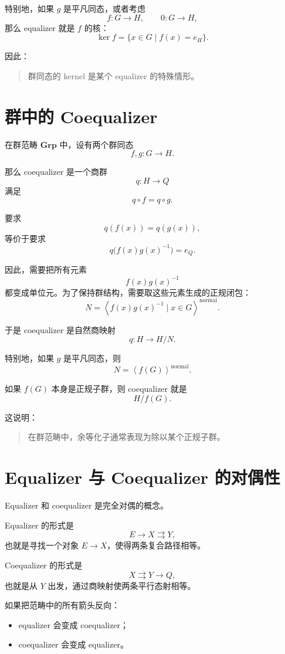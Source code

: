 \documentclass[UTF8, a4paper, 12pt]{ctexart}
\newcommand{\Grp}{\mathbf{Grp}}
\newcommand{\normalcl}[1]{\left\langle #1 \right\rangle^{\mathrm{normal}}}
\begin{document}
特别地，如果 \(g\) 是平凡同态，或者考虑
\[
f\colon G\to H,\qquad 0\colon G\to H,
\]
那么 equalizer 就是 \(f\) 的核：
\[
\ker f
=
\{x\in G\mid f(x)=e_H\}.
\]

因此：

\begin{quote}
群同态的 kernel 是某个 equalizer 的特殊情形。
\end{quote}

\section{群中的 Coequalizer}

在群范畴 \(\Grp\) 中，设有两个群同态
\[
f,g\colon G\to H.
\]

那么 coequalizer 是一个商群
\[
q\colon H\to Q
\]
满足
\[
q\circ f=q\circ g.
\]

要求
\[
q(f(x))=q(g(x)),
\]
等价于要求
\[
q\bigl(f(x)g(x)^{-1}\bigr)=e_Q.
\]

因此，需要把所有元素
\[
f(x)g(x)^{-1}
\]
都变成单位元。为了保持群结构，需要取这些元素生成的正规闭包：
\[
N=
\normalcl{
f(x)g(x)^{-1}\mid x\in G
}.
\]

于是 coequalizer 是自然商映射
\[
q\colon H\to H/N.
\]

特别地，如果 \(g\) 是平凡同态，则
\[
N=\normalcl{f(G)}.
\]

如果 \(f(G)\) 本身是正规子群，则 coequalizer 就是
\[
H/f(G).
\]

这说明：

\begin{quote}
在群范畴中，余等化子通常表现为除以某个正规子群。
\end{quote}

\section{Equalizer 与 Coequalizer 的对偶性}

Equalizer 和 coequalizer 是完全对偶的概念。

Equalizer 的形式是
\[
E\longrightarrow X\rightrightarrows Y,
\]
也就是寻找一个对象 \(E\to X\)，使得两条复合路径相等。

Coequalizer 的形式是
\[
X\rightrightarrows Y\longrightarrow Q,
\]
也就是从 \(Y\) 出发，通过商映射使两条平行态射相等。

如果把范畴中的所有箭头反向：

\begin{itemize}
    \item equalizer 会变成 coequalizer；
    \item coequalizer 会变成 equalizer。
\end{itemize}
\end{document}
